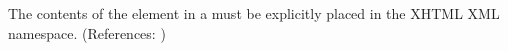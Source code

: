 The contents of the  element in a \Constraint must be
explicitly placed in the XHTML XML namespace.  (References: )
